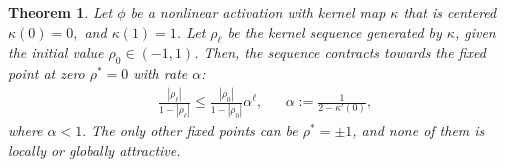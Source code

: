\documentclass[twoside]{article}
\newtheorem{theorem}{Theorem}
\theoremstyle{definition}
\newcommand{\thomas}[1]{{\color{blue}\textit{#1}}}
\begin{document}
\begin{theorem}\label{thm:global_attract_centered}
Let $\phi$ be a nonlinear activation with kernel map $\kappa$ that is centered $\kappa(0)=0,$ and $\kappa(1)=1$. 
Let $\rho_\ell$ be the kernel sequence generated by $\kappa$, given the initial value $\rho_0 \in(-1 , 1)$.
Then, the sequence contracts towards the fixed point at zero $\rho^*=0$ with rate $\alpha$:
    \begin{align}
        &\frac{|\rho_\ell|}{1-|\rho_\ell|} \le \frac{|\rho_0|}{1-|\rho_0|}\alpha^{\ell}, && \alpha := \frac{1}{2-\kappa'(0)},
    \end{align}
 where $\alpha<1.$ The only other fixed points can be $\rho^*=\pm 1$, and none of them is locally or globally attractive.
\end{theorem}
\end{document}
